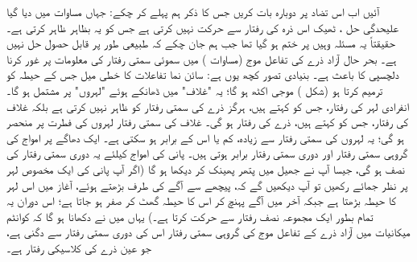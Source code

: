 آئیں اب اس تضاد پر دوبارہ بات کریں جس کا ذکر ہم پہلے کر چکے: جہاں مساوات  میں دیا گیا علیحدگی حل ، ٹھیک اس ذرہ کی رفتار سے حرکت نہیں کرتی ہے جس کو یہ بظاہر ظاہر کرتی ہے۔ حقیقتاً یہ مسئلہ وہیں پر ختم ہو گیا تھا جب ہم جان چکے کہ  طبیعی طور پر قابل حصول حل نہیں ہے۔ بحر حال آزاد ذرے کی تفاعل موج (مساوات ) میں سموئی سمتی رفتار کی معلومات پر غور کرنا دلچسپی کا باعث ہے۔ بنیادی تصور کچھ یوں ہے: سائن نما تفاعلات کا خطی میل جس کے حیطہ کو  ترمیم کرتا ہو (شکل ) موجی اکٹھ ہو گا؛ یہ "غلاف" میں ڈھانکے ہوئے "لہروں" پر مشتمل ہو گا۔ انفرادی لہر کی رفتار، جس کو   کہتے ہیں، ہرگز ذرے کی سمتی رفتار کو ظاہر نہیں کرتی ہے بلکہ غلاف کی رفتار، جس کو  کہتے ہیں، ذرے کی رفتار ہو گی۔ غلاف کی سمتی رفتار لہروں کی فطرت پر منحصر ہو گی؛ یہ لہروں کی سمتی رفتار سے زیادہ، کم یا اس کے برابر ہو سکتی ہے۔ ایک دھاگے پر امواج کی گروہی سمتی رفتار اور دوری سمتی رفتار  برابر ہوتی ہیں۔ پانی کی امواج کیلئے یہ دوری سمتی رفتار کی نصف ہو گی، جیسا آپ نے جھیل میں پتھر پھینک کر دیکھا ہو گا (اگر آپ پانی کی ایک مخصوص لہر پر نظر جمائے رکھیں تو آپ دیکھیں گے کہ، پیچھے سے آگے کی طرف بڑھتے ہوئے، آغاز میں اس لہر کا حیطہ بڑھتا ہے جبکہ آخر میں آگے پہنچ کر اس کا حیطہ گھٹ کر صفر ہو جاتا ہے؛ اس دوران یہ تمام بطور ایک مجموعہ نصف رفتار سے حرکت کرتا ہے۔) یہاں میں نے دکھانا ہو گا کہ کوانٹم میکانیات میں آزاد ذرے کے تفاعل موج کی گروہی سمتی رفتار اس کی دوری سمتی رفتار سے دگنی ہے، جو عین ذرے کی کلاسیکی رفتار ہے۔


